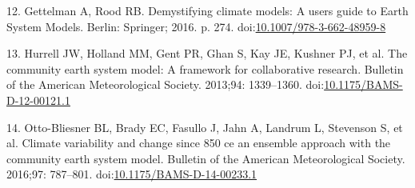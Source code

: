 \documentclass[10pt,letterpaper]{article}
\begin{document}
\hypertarget{ref-Gettelman}{}
12. Gettelman A, Rood RB. Demystifying climate models: A users guide to
Earth System Models. Berlin: Springer; 2016. p. 274.
doi:\href{https://doi.org/10.1007/978-3-662-48959-8}{10.1007/978-3-662-48959-8}

\hypertarget{ref-Hurrell2013}{}
13. Hurrell JW, Holland MM, Gent PR, Ghan S, Kay JE, Kushner PJ, et al.
The community earth system model: A framework for collaborative
research. Bulletin of the American Meteorological Society. 2013;94:
1339--1360.
doi:\href{https://doi.org/10.1175/BAMS-D-12-00121.1}{10.1175/BAMS-D-12-00121.1}

\hypertarget{ref-Otto-bliesner2015}{}
14. Otto-Bliesner BL, Brady EC, Fasullo J, Jahn A, Landrum L, Stevenson
S, et al. Climate variability and change since 850 ce an ensemble
approach with the community earth system model. Bulletin of the American
Meteorological Society. 2016;97: 787--801.
doi:\href{https://doi.org/10.1175/BAMS-D-14-00233.1}{10.1175/BAMS-D-14-00233.1}

\nolinenumbers
\end{document}
